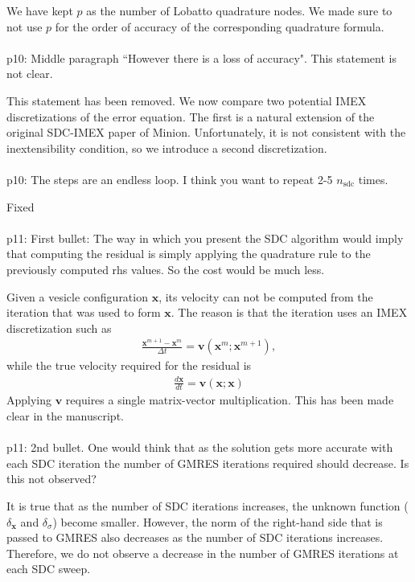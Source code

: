 \documentclass[12pt]{article}
\newcommand{\comment}[1]{{\color{blue} #1}}
\newcommand{\sdc}{{\mathrm{sdc}}}
\newcommand{\vv}{{\mathbf{v}}}
\newcommand{\xx}{{\mathbf{x}}}
\begin{document}
We have kept $p$ as the number of Lobatto quadrature nodes.  We made
sure to not use $p$ for the order of accuracy of the corresponding
quadrature formula.
\\ \\
\comment{p10: Middle paragraph  ``However there is a loss of accuracy".
This statement is not clear.}

This statement has been removed.  We now compare two potential IMEX
discretizations of the error equation.  The first is a natural extension
of the original SDC-IMEX paper of Minion.  Unfortunately, it is not
consistent with the inextensibility condition, so we introduce a second
discretization. \\ \\
\comment{p10: The steps are an endless loop.  I think you want to repeat
2-5 $n_{\sdc}$ times.}

Fixed \\ \\
\comment{p11: First bullet:  The way in which you present the SDC
algorithm would imply that computing the residual is simply applying the
quadrature rule to the previously computed rhs values.  So the cost
would be much less.}

Given a vesicle configuration $\xx$, its velocity can not be computed
from the iteration that was used to form $\xx$.  The reason is that the
iteration uses an IMEX discretization such as
\begin{align*}
  \frac{\xx^{m+1} - \xx^{m}}{\Delta t} = \vv(\xx^{m};\xx^{m+1}),
\end{align*} 
while the true velocity required for the residual is
\begin{align*}
  \frac{d\xx}{dt} = \vv(\xx;\xx)
\end{align*}
Applying $\vv$ requires a single matrix-vector multiplication.  This has
been made clear in the manuscript. \\ \\
\comment{p11: 2nd bullet.  One would think that as the solution gets
more accurate with each SDC iteration the number of GMRES iterations
required should decrease.  Is this not observed?}

It is true that as the number of SDC iterations increases, the unknown
function ($\delta_{\xx}$ and $\delta_{\sigma}$) become smaller.
However, the norm of the right-hand side that is passed to GMRES also
decreases as the number of SDC iterations increases.  Therefore, we do
not observe a decrease in the number of GMRES iterations at each SDC
sweep. 
\end{document}
